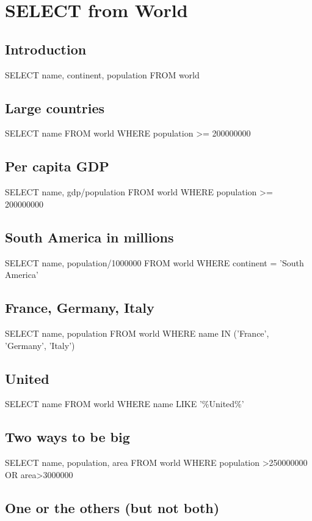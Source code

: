 \documentclass[10pt, oneside]{article}
\begin{document}
\section{SELECT from World}

\subsection{Introduction}

SELECT name, continent, population FROM world

\subsection{Large countries}

SELECT name FROM world WHERE population >= 200000000

\subsection{Per capita GDP}

SELECT name, gdp/population FROM world WHERE population >= 200000000

\subsection{South America in millions}

SELECT name, population/1000000 FROM world WHERE continent = 'South America'

\subsection{France, Germany, Italy}

SELECT name, population FROM world WHERE name IN ('France', 'Germany', 'Italy')

\subsection{United}

SELECT name FROM world WHERE name LIKE '\%United\%'

\subsection{Two ways to be big}

SELECT name, population, area FROM world WHERE population >250000000 OR area>3000000

\subsection{One or the others (but not both)}
\end{document}
